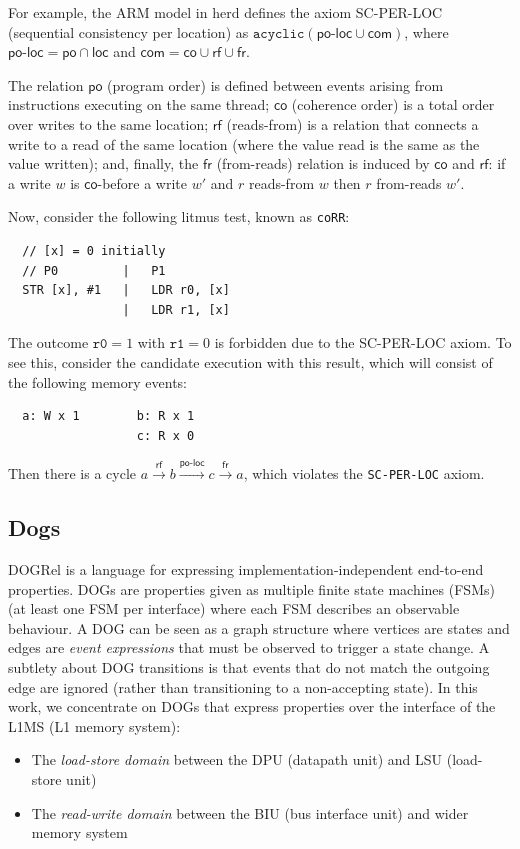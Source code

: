 \documentclass[10pt]{paper}
\newcommand{\po}{\mathsf{po}}
\newcommand{\poloc}{\mathsf{po\text{-}loc}}
\newcommand{\co}{\mathsf{co}}
\newcommand{\rf}{\mathsf{rf}}
\newcommand{\fr}{\mathsf{fr}}
\newcommand{\com}{\mathsf{com}}
\newcommand{\loc}{\mathsf{loc}}
\newcommand{\axiom}[1]{\textsc{#1}}
\newcommand{\litmus}[1]{\texttt{#1}}
\begin{document}
For example, the ARM model in herd defines the axiom
  \axiom{SC-PER-LOC} (sequential consistency per location)
as
  $\texttt{acyclic} (\poloc \cup \com)$,
where
  $\poloc = \po \cap \loc$
and
  $\com = \co \cup \rf \cup \fr$.

The relation $\po$ (program order) is defined between events arising from instructions executing on the same thread;
%
$\co$ (coherence order) is a total order over writes to the same location;
%
$\rf$ (reads-from) is a relation that connects a write to a read of the same location (where the value read is the same as the value written);
%
and, finally, the $\fr$ (from-reads) relation is induced by $\co$ and $\rf$: if a write $w$ is $\co$-before a write $w'$ and $r$ reads-from $w$ then $r$ from-reads $w'$.

Now, consider the following litmus test, known as \litmus{coRR}:
%
\begin{verbatim}
  // [x] = 0 initially
  // P0         |   P1
  STR [x], #1   |   LDR r0, [x]
                |   LDR r1, [x]
\end{verbatim}

The outcome $\texttt{r0} = 1$ with $\texttt{r1} = 0$ is forbidden due to the \axiom{SC-PER-LOC} axiom.
%
To see this, consider the candidate execution with this result, which will consist of the following memory events:
%
\begin{verbatim}
  a: W x 1        b: R x 1
                  c: R x 0
\end{verbatim}
%
Then there is a cycle $a \xrightarrow{\rf} b \xrightarrow{\poloc} c \xrightarrow{\fr} a$, which violates the \texttt{SC-PER-LOC} axiom.

\subsection{Dogs}

DOGRel is a language for expressing implementation-independent end-to-end properties.
%
DOGs are properties given as multiple finite state machines (FSMs) (at least one FSM per interface) where each FSM describes an observable behaviour.
%
A DOG can be seen as a graph structure where vertices are states and edges are \emph{event expressions} that must be observed to trigger a state change.
%
A subtlety about DOG transitions is that events that do not match the outgoing edge are ignored (rather than transitioning to a non-accepting state).
%
In this work, we concentrate on DOGs that express properties over the interface of the L1MS (L1 memory system):
\begin{itemize}
%
\item The \emph{load-store domain} between the DPU (datapath unit) and LSU (load-store unit)
%
\item The \emph{read-write domain} between the BIU (bus interface unit) and wider memory system
%
\end{itemize}
\end{document}
